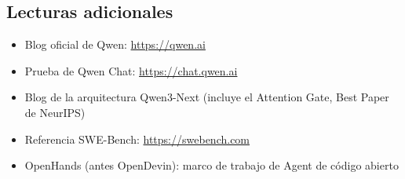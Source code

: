 \subsection{Lecturas adicionales}

\begin{itemize}
    \item Blog oficial de Qwen: \url{https://qwen.ai}
    \item Prueba de Qwen Chat: \url{https://chat.qwen.ai}
    \item Blog de la arquitectura Qwen3-Next (incluye el Attention Gate, Best Paper de NeurIPS)
    \item Referencia SWE-Bench: \url{https://swebench.com}
    \item OpenHands (antes OpenDevin): marco de trabajo de Agent de código abierto
\end{itemize}



